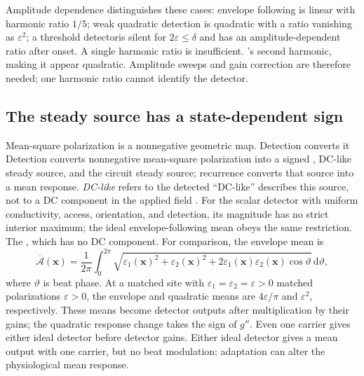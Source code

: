 \documentclass[11pt,a4paper]{article}
\providecommand{\DIFaddtex}[1]{{\protect\color{blue} \sf #1}} %
\providecommand{\DIFdeltex}[1]{{\protect\color{red} \scriptsize #1}} %
\providecommand{\DIFaddbegin}{} %
\providecommand{\DIFaddend}{} %
\providecommand{\DIFdelbegin}{} %
\providecommand{\DIFdelend}{} %
\providecommand{\DIFadd}[1]{\texorpdfstring{\DIFaddtex{#1}}{#1}} %
\providecommand{\DIFdel}[1]{\texorpdfstring{\DIFdeltex{#1}}{}} %
\begin{document}
\DIFdel{Amplitude dependence distinguishes these cases: envelope following is linear
with harmonic ratio $1/5$; weak quadratic detection is quadratic with a ratio
vanishing as $\varepsilon^2$; a threshold detectoris silent for
$2\varepsilon\le\delta$ and has an amplitude-dependent ratio after onset.
A single harmonic ratio is insufficient.
}\DIFdelend \DIFaddbegin \DIFadd{'s second harmonic,
making it appear quadratic. Amplitude sweeps and gain correction are
therefore needed; one harmonic ratio cannot identify the detector.
}\DIFaddend

\subsection{The steady source has a state-dependent sign}\label{sec:dc}
\DIFdelbegin \DIFdel{Mean-square polarization is a nonnegative geometric map. Detection converts it
}\DIFdelend \DIFaddbegin \DIFadd{Detection converts nonnegative mean-square polarization }\DIFaddend into a signed \DIFdelbegin \DIFdel{, DC-like steady
source, and the circuit }\DIFdelend \DIFaddbegin \DIFadd{steady
source; recurrence }\DIFaddend converts that source into a mean response. \DIFdelbegin \DIFdel{\emph{DC-like} refers to the detected }\DIFdelend \DIFaddbegin \DIFadd{``DC-like''
describes this }\DIFaddend source, not \DIFdelbegin \DIFdel{to a DC component in }\DIFdelend the applied field\DIFdelbegin \DIFdel{. For the scalar detector with uniform conductivity, access, orientation, and
detection, its magnitude has no strict interior maximum; the ideal
envelope-following mean obeys the same restriction.
The }\DIFdelend \DIFaddbegin \DIFadd{, which has no DC component.
For comparison, the }\DIFaddend envelope mean is
\[
\overline{\mathcal A}(\mathbf x)=\frac{1}{2\pi}\int_0^{2\pi}
\sqrt{\varepsilon_1(\mathbf x)^2+\varepsilon_2(\mathbf x)^2
+2\varepsilon_1(\mathbf x)\varepsilon_2(\mathbf x)\cos\vartheta}\,\mathrm d\vartheta,
\]
where $\vartheta$ is beat phase. At \DIFdelbegin \DIFdel{a matched site with
$\varepsilon_1=\varepsilon_2=\varepsilon>0$}\DIFdelend \DIFaddbegin \DIFadd{matched polarizations $\varepsilon>0$}\DIFaddend ,
the envelope and quadratic means are $4\varepsilon/\pi$ and
$\varepsilon^2$, \DIFdelbegin \DIFdel{respectively. These means become detector outputs after multiplication by their gains; the
quadratic response change takes the sign of $g''$. Even one carrier gives either ideal detector }\DIFdelend \DIFaddbegin \DIFadd{before detector gains. Either ideal detector gives }\DIFaddend a mean
output \DIFaddbegin \DIFadd{with one carrier}\DIFaddend , but no beat\DIFdelbegin \DIFdel{modulation}\DIFdelend ; adaptation can alter the \DIFdelbegin \DIFdel{physiological }\DIFdelend mean response.
\end{document}
